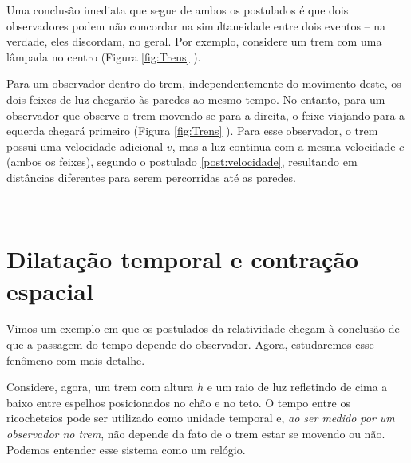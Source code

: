 Uma conclusão imediata que segue de ambos os postulados é que dois observadores podem não concordar na simultaneidade entre dois eventos -- na verdade, eles discordam, no geral. Por exemplo, considere um trem com uma lâmpada no centro (Figura \ref{fig:Trens} ).

Para um observador dentro do trem, independentemente do movimento deste, os dois feixes de luz chegarão às paredes ao mesmo tempo. No entanto, para um observador que observe o trem movendo-se para a direita, o feixe viajando para a equerda chegará primeiro (Figura \ref{fig:Trens} ). Para esse observador, o trem possui uma velocidade adicional $v$, mas a luz continua com a mesma velocidade $c$ (ambos os feixes), segundo o postulado \ref{post:velocidade}, resultando em distâncias diferentes para serem percorridas até as paredes.


\begin{figure*}[t]
    \centering
    \begin{subfigure}[t]{0.49\textwidth}
        \centering
        \caption{}
        \label{fig:trem}
    \end{subfigure}%
    ~ 
    \begin{subfigure}[t]{0.49\textwidth}
        \centering
        \caption{}
        \label{fig:TremMovimento}
    \end{subfigure}
    \caption{ {\small Feixes de luz partindo do centro de um trem para (a) um observador que anda junto ao trem e (b) para um observador que vê o trem movendo-se com velocidade $v$ para a direita.}  }
\label{fig:Trens}
\end{figure*}

\section{Dilatação temporal e contração espacial}\label{sec:DilatacaoContracao}
Vimos um exemplo em que os postulados da relatividade chegam à conclusão de que a passagem do tempo depende do observador. Agora, estudaremos esse fenômeno com mais detalhe.

Considere, agora, um trem com altura $h$ e um raio de luz refletindo de cima a baixo entre espelhos posicionados no chão e no teto. O tempo entre os ricocheteios pode ser utilizado como unidade temporal e, \textit{ao ser medido por um observador no trem}, não depende da fato de o trem estar se movendo ou não. Podemos entender esse sistema como um relógio. 

